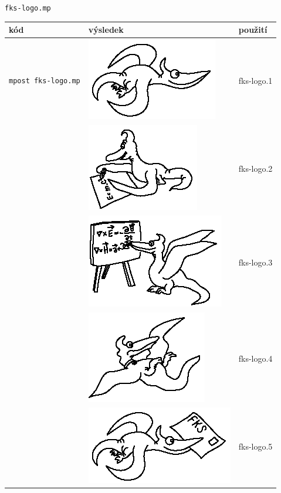 \documentclass[a4paper,10pt]{article}
\begin{document}
{\centering\large\texttt{fks-logo.mp}\nopagebreak\\\medskip\noindent}
\begin{tabularx}{\textwidth}{|l|l|X|}\hline
    kód & výsledek & použití\\\hline
    \verb+mpost fks-logo.mp+&\includegraphics{fks-logo_1}& fks-logo.1\\\hline
    &\includegraphics{fks-logo_2}& fks-logo.2\\\hline
    &\includegraphics{fks-logo_3}& fks-logo.3\\\hline
    &\includegraphics{fks-logo_4}& fks-logo.4\\\hline
    &\includegraphics{fks-logo_5}& fks-logo.5\\\hline

\end{tabularx}
\end{document}
